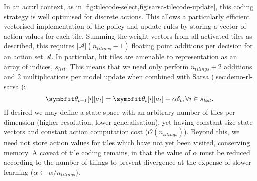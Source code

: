 In an \gls{acr:rl} context, as in \cref{fig:tilecode-select,fig:sarsa-tilecode-update}, this coding strategy is well optimised for discrete actions.
This allows a particularly efficient vectorised implementation of the policy and update rules by storing a vector of action values for each tile.
Summing the weight vectors from all activated tiles as described, this requires  $|\mathcal{A}|(n_{\mathit{tilings}}-1)$ floating point additions per decision for an action set $\mathcal{A}$.
In particular, hit tiles are amenable to representation as an array of indices, $s_{\mathit{list}}$.
This means that we need only perform $n_{\mathit{tilings}} + 2$ additions and \num{2} multiplications per model update when combined with Sarsa (\cref{sec:demo-rl-sarsa}):
\begin{equation}
	\wvec{t+1}[i][a_t] = \wvec{t}[i][a_t] + \alpha \delta_t, \forall i \in s_{\mathit{list}}.
	\label{eqn:sg-sarsa-opt}
\end{equation}
If desired we may define a state space with an arbitrary number of tiles per dimension (higher-resolution, lower generalisation), yet having constant-size state vectors and constant action computation cost ($\mathcal{O}(n_{\mathit{tilings}})$).
Beyond this, we need not store action values for tiles which have not yet been visited, conserving memory.
A caveat of tile coding remains, in that the value of $\alpha$ must be reduced according to the number of tilings to prevent divergence at the expense of slower learning ($\alpha \leftarrow \alpha / n_{\mathit{tilings}}$).


